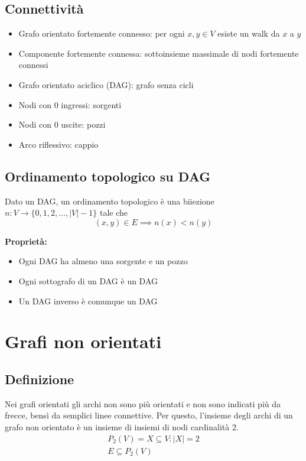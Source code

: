 \documentclass[a4paper,12pt]{article}
\let\oldsection\section
\renewcommand{\section}{\clearpage\oldsection}
\begin{document}
\subsection{Connettività}

\begin{itemize}
    \item Grafo orientato fortemente connesso: per ogni $x,y \in V$ esiste un walk da $x$ a $y$
    \item Componente fortemente connessa: sottoinsieme massimale di nodi fortemente connessi
    \item Grafo orientato aciclico (DAG): grafo senza cicli
    \item Nodi con 0 ingressi: sorgenti
    \item Nodi con 0 uscite: pozzi
    \item Arco riflessivo: cappio
\end{itemize}

\subsection{Ordinamento topologico su DAG}

Dato un DAG, un ordinamento topologico è una biiezione $n: V \to \{0,1,2,\dots,|V|-1\}$ tale che
\[
(x,y) \in E \implies n(x) < n(y)
\]

\textbf{Proprietà:}
\begin{itemize}
    \item Ogni DAG ha almeno una sorgente e un pozzo
    \item Ogni sottografo di un DAG è un DAG
    \item Un DAG inverso è comunque un DAG
\end{itemize}

\section{Grafi non orientati}
\subsection{Definizione}
Nei grafi orientati gli archi non sono più orientati e non sono indicati più da frecce, bensì da semplici linee connettive.
Per questo, l'insieme degli archi di un grafo non orientato è un insieme di insiemi di nodi cardinalità 2.
\begin{align*}
P_2(V) = {X \subseteq V : |X| = 2}\\
E \subseteq P_2(V)
\end{align*}
\end{document}
